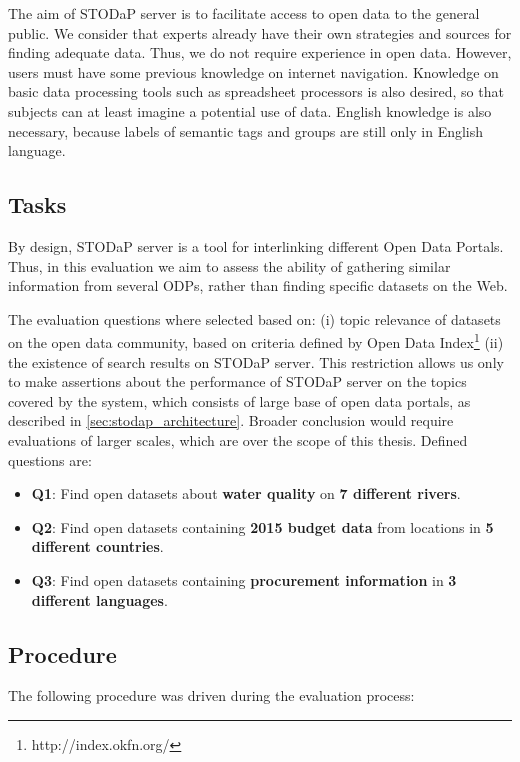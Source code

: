 The aim of STODaP server is to facilitate access to open data to the general public.
We consider that experts already have their own strategies and sources for finding adequate data.
Thus, we do not require experience in open data.
However, users must have some previous knowledge on internet navigation. 
Knowledge on basic data processing tools such as spreadsheet processors is also desired, so that subjects can at least imagine a potential use of data.
English knowledge is also necessary, because labels of semantic tags and groups are still only in English language.


\subsection{Tasks}

By design, STODaP server is a tool for interlinking different Open Data Portals.
Thus, in this evaluation we aim to assess the ability of gathering similar information from several ODPs, rather than finding specific datasets on the Web.

The evaluation questions where selected based on: (i) topic relevance of datasets on the open data community, based on criteria defined by Open Data Index\footnote{http://index.okfn.org/} (ii) the existence of search results on STODaP server.
This restriction allows us only to make assertions about the performance of STODaP server on the topics covered by the system, which consists of large base of open data portals, as described in \autoref{sec:stodap_architecture}.
Broader conclusion would require evaluations of larger scales, which are over the scope of this thesis.
Defined questions are:

\begin{itemize}
	\item \textbf{Q1}: Find open datasets about \textbf{water quality} on \textbf{7 different rivers}.
	\item \textbf{Q2}: Find open datasets containing \textbf{2015 budget data} from locations in \textbf{5 different countries}.
	\item \textbf{Q3}: Find open datasets containing \textbf{procurement information} in \textbf{3 different languages}.
\end{itemize}

\subsection{Procedure}

The following procedure was driven during the evaluation process:

